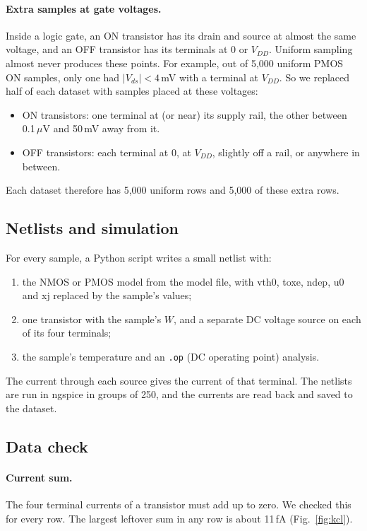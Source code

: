 \documentclass{article}
\begin{document}
\paragraph{Extra samples at gate voltages.}
Inside a logic gate, an ON transistor has its drain and source at almost the
same voltage, and an OFF transistor has its terminals at 0 or $V_{DD}$.
Uniform sampling almost never produces these points. For example, out of
5{,}000 uniform PMOS ON samples, only one had $|V_{ds}| < 4$\,mV with a
terminal at $V_{DD}$. So we replaced half of each dataset with samples
placed at these voltages:
\begin{itemize}
    \item ON transistors: one terminal at (or near) its supply rail, the other
          between 0.1\,$\mu$V and 50\,mV away from it.
    \item OFF transistors: each terminal at 0, at $V_{DD}$, slightly off a
          rail, or anywhere in between.
\end{itemize}
Each dataset therefore has 5{,}000 uniform rows and 5{,}000 of these extra
rows.

\subsection{Netlists and simulation}

For every sample, a Python script writes a small netlist with:
\begin{enumerate}
    \item the NMOS or PMOS model from the model file, with vth0, toxe, ndep,
          u0 and xj replaced by the sample's values;
    \item one transistor with the sample's $W$, and a separate DC voltage
          source on each of its four terminals;
    \item the sample's temperature and an \texttt{.op} (DC operating point)
          analysis.
\end{enumerate}
The current through each source gives the current of that terminal. The
netlists are run in ngspice in groups of 250, and the currents are read
back and saved to the dataset.

\subsection{Data check}

\paragraph{Current sum.}
The four terminal currents of a transistor must add up to zero. We checked
this for every row. The largest leftover sum in any row is
about 11\,fA (Fig.~\ref{fig:kcl}).
\end{document}
